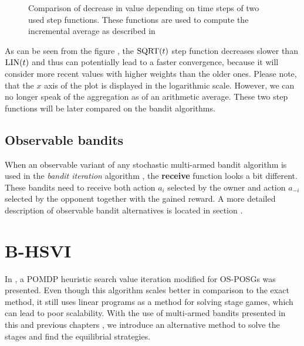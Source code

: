 \documentclass[../main.tex]{subfiles}
\begin{document}
\begin{figure}[ht]
    \caption[Accumulating step function]{Comparison of decrease in value depending on time steps of two used step functions. These functions are used to compute the incremental average as described in }
    \label{new:bandititeration:steps}
\end{figure}

As can be seen from the figure , the $\text{SQRT}(t)$ step function decreases slower than $\text{LIN}(t)$ and thus can potentially lead to a faster convergence, because it will consider more recent values with higher weights than the older ones.
Please note, that the $x$ axis of the plot is displayed in the logarithmic scale.
However, we can no longer speak of the aggregation as of an arithmetic average.
These two step functions will be later compared on the bandit algorithms.

\subsection{Observable bandits}\label{new:bandititeration:obs}
When an observable variant of any stochastic multi-armed bandit algorithm is used in the \textit{bandit iteration} algorithm , the \textbf{receive} function looks a bit different.
These bandits need to receive both action $a_i$ selected by the owner and action $a_{-i}$ selected by the opponent together with the gained reward.
A more detailed description of observable bandit alternatives is located in section .

\section{B-HSVI}\label{new:bhsvi}
In , a POMDP heuristic search value iteration modified for OS-POSGs  was presented.
Even though this algorithm scales better in comparison to the exact method, it still uses linear programs as a method for solving stage games, which can lead to poor scalability.
With the use of multi-armed bandits presented in this and previous chapters , we introduce an alternative method to solve the stages and find the equilibrial strategies.
\end{document}
